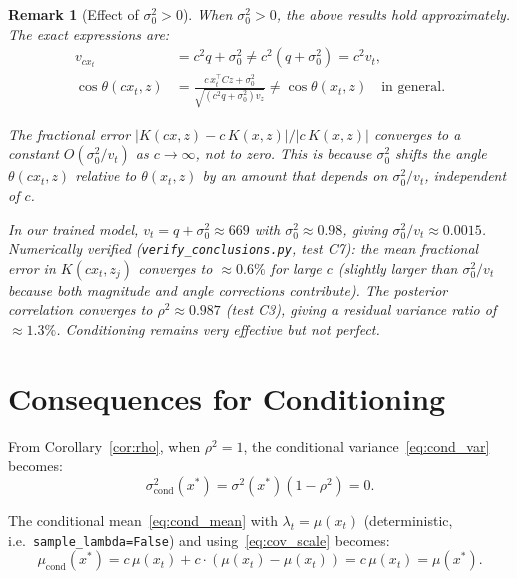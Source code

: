 \documentclass[11pt]{article}
\newtheorem{remark}{Remark}
\begin{document}
\begin{remark}[Effect of $\sigma_0^2 > 0$]\label{rem:sigma0}
When $\sigma_0^2 > 0$, the above results hold approximately.
The exact expressions are:
\begin{align}
    v_{cx_t} &= c^2 q + \sigma_0^2 \neq c^2 (q + \sigma_0^2) = c^2 v_t, \\
    \cos\theta(cx_t, z) &= \frac{c \, x_t^\top C z + \sigma_0^2}{\sqrt{(c^2 q + \sigma_0^2) v_z}}
    \neq \cos\theta(x_t, z) \quad \text{in general.}
\end{align}

The fractional error $|K(cx, z) - c \, K(x, z)| / |c \, K(x,z)|$ converges to a
\emph{constant} $O(\sigma_0^2/v_t)$ as $c \to \infty$, not to zero.
This is because $\sigma_0^2$ shifts the angle $\theta(cx_t, z)$ relative to
$\theta(x_t, z)$ by an amount that depends on $\sigma_0^2/v_t$, independent of $c$.

In our trained model, $v_t = q + \sigma_0^2 \approx 669$ with
$\sigma_0^2 \approx 0.98$, giving $\sigma_0^2 / v_t \approx 0.0015$.
Numerically verified (\texttt{verify\_conclusions.py}, test C7):
the mean fractional error in $K(cx_t, z_j)$ converges to
$\approx 0.6\%$ for large $c$ (slightly larger than $\sigma_0^2/v_t$
because both magnitude and angle corrections contribute).
The posterior correlation converges to $\rho^2 \approx 0.987$
(test C3), giving a residual variance ratio of $\approx 1.3\%$.
Conditioning remains very effective but not perfect.
\end{remark}

\section{Consequences for Conditioning}

From Corollary~\ref{cor:rho}, when $\rho^2 = 1$, the conditional variance~\eqref{eq:cond_var} becomes:
\begin{equation}
    \sigma^2_{\text{cond}}(x^*) = \sigma^2(x^*)(1 - \rho^2) = 0.
\end{equation}

The conditional mean~\eqref{eq:cond_mean} with $\lambda_t = \mu(x_t)$
(deterministic, i.e.\ \texttt{sample\_lambda=False}) and
using~\eqref{eq:cov_scale} becomes:
\begin{equation}
    \mu_{\text{cond}}(x^*) = c \, \mu(x_t) + c \cdot (\mu(x_t) - \mu(x_t)) = c \, \mu(x_t) = \mu(x^*).
\end{equation}
\end{document}

